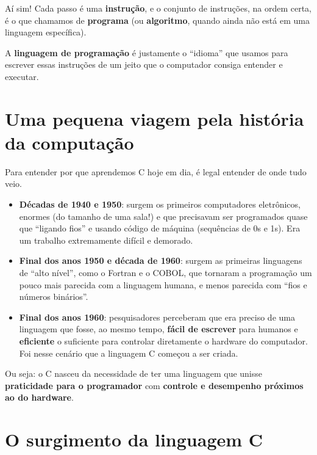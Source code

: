 Aí sim! Cada passo é uma \textbf{instrução}, e o conjunto de instruções, na ordem certa, é o que chamamos de \textbf{programa} (ou \textbf{algoritmo}, quando ainda não está em uma linguagem específica).

A \textbf{linguagem de programação} é justamente o ``idioma'' que usamos para escrever essas instruções de um jeito que o computador consiga entender e executar.

\section{\textcolor{azulPrincipal}{Uma pequena viagem pela história da computação}}

Para entender por que aprendemos C hoje em dia, é legal entender de onde tudo veio.

\begin{itemize}
    \item \textcolor{laranja}{\textbf{Décadas de 1940 e 1950}}: surgem os primeiros computadores eletrônicos, enormes (do tamanho de uma sala!) e que precisavam ser programados quase que ``ligando fios'' e usando código de máquina (sequências de 0s e 1s). Era um trabalho extremamente difícil e demorado.
    
    \item \textcolor{laranja}{\textbf{Final dos anos 1950 e década de 1960}}: surgem as primeiras linguagens de ``alto nível'', como o Fortran e o COBOL, que tornaram a programação um pouco mais parecida com a linguagem humana, e menos parecida com ``fios e números binários''.
    
    \item \textcolor{laranja}{\textbf{Final dos anos 1960}}: pesquisadores perceberam que era preciso de uma linguagem que fosse, ao mesmo tempo, \textbf{fácil de escrever} para humanos e \textbf{eficiente} o suficiente para controlar diretamente o hardware do computador. Foi nesse cenário que a linguagem C começou a ser criada.
\end{itemize}

Ou seja: o C nasceu da necessidade de ter uma linguagem que unisse \textbf{\textcolor{verdeC}{praticidade para o programador}} com \textbf{\textcolor{verdeC}{controle e desempenho próximos ao do hardware}}.

\section{\textcolor{azulPrincipal}{O surgimento da linguagem C}}

